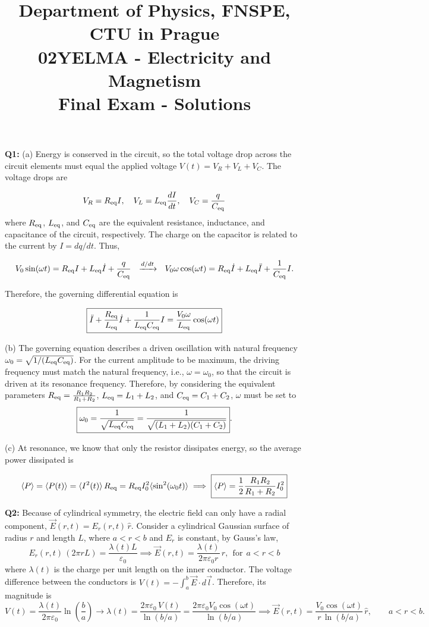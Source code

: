 \documentclass[a4paper,12pt]{article}
\title{{\large Department of Physics, FNSPE, CTU in Prague} \\
                  02YELMA - Electricity and Magnetism \\ 
          {\Large \textbf{Final Exam - Solutions}}\vspace{-1cm}}
\date{}
\author{}
\begin{document}
\maketitle
\vspace{-0.9cm}

\noindent

\textbf{Q1:} (a) Energy is conserved in the circuit, so the total voltage drop across the circuit elements must equal the applied voltage $V(t)=V_R+V_L+V_C$. The voltage drops are

\[
V_R = R_{\rm eq} I, \quad V_L = L_{\rm eq}\frac{dI}{dt}, \quad V_C = \frac{q}{C_{\rm eq}}
\]
where $R_{\rm eq}$, $L_{\rm eq}$, and $C_{\rm eq}$ are the equivalent resistance, inductance, and capacitance of the circuit, respectively. The charge on the capacitor is related to the current by $I=dq/dt$. Thus,

\[
V_0\sin(\omega t)
=
R_{\rm eq} I
+
L_{\rm eq}\dot{I}
+
\frac{q}{C_{\rm eq}} ~~\xrightarrow{d/dt}~~ V_0\omega\cos(\omega t)
=
R_{\rm eq}\dot{I}
+
L_{\rm eq}\ddot{I}
+
\frac{1}{C_{\rm eq}}I.
\]

Therefore, the governing differential equation is

\[
\boxed{
\ddot{I}
+
\frac{{R}_{\rm eq}}{L_{\rm eq}}\dot{I}
+
\frac{1}{L_{\rm eq}C_{\rm eq}}I
=
\frac{V_0\omega}{L_{\rm eq}}\cos(\omega t)
}
\]

(b) The governing equation describes a driven oscillation with natural frequency $\omega_0=\sqrt{1/(L_{\rm eq}C_{\rm eq})}$. For the current amplitude to be maximum, the driving frequency must match the natural frequency, i.e., $\omega=\omega_0$, so that the circuit is driven at its resonance frequency. Therefore, by considering the equivalent parameters $R_{\rm eq}=\frac{R_1R_2}{R_1+R_2}$, $L_{\rm eq}=L_1+L_2$, and $C_{\rm eq}=C_1+C_2$, $\omega$ must be set to
\[
\boxed{
\omega_0
=
\frac{1}{\sqrt{L_{\rm eq}C_{\rm eq}}}
=
\frac{1}{\sqrt{(L_1+L_2)(C_1+C_2)}}
}.
\]

(c) At resonance, we know that only the resistor dissipates energy, so the average power dissipated is

\[ \langle P \rangle =
\langle P(t) \rangle=\langle I^2(t) \rangle\,R_{\rm eq}=R_{\rm eq} I_0^2 \langle \sin^2(\omega_0 t) \rangle \implies \boxed{\langle P \rangle=\frac{1}{2}\frac{R_1R_2}{R_1+R_2} I_0^2}
\]

\textbf{Q2:} 
Because of cylindrical symmetry, the electric field can only have a radial component, $\vec E(r,t)=E_r(r,t)\,\hat r$. Consider a cylindrical Gaussian surface of radius \(r\) and length \(L\), where \(a<r<b\) and $E_r$ is constant, by Gauss's law,
\[
E_r(r,t)\,(2\pi rL)
=
\frac{\lambda(t)L}{\varepsilon_0} \implies \vec E(r,t)
=
\frac{\lambda(t)}{2\pi\varepsilon_0 r}\,\hat r,
~~\text{for}~~a<r<b
\]
where \(\lambda(t)\) is the charge per unit length on the inner conductor. The voltage difference between the conductors is $V(t)= -\int_a^b \vec E\cdot d\vec l$. Therefore, its magnitude is
\[
V(t)
=
\frac{\lambda(t)}{2\pi\varepsilon_0}
\ln\!\left(\frac{b}{a}\right) \rightarrow \lambda(t)
=
\frac{2\pi\varepsilon_0\,V(t)} 
{\ln(b/a)} =
\frac{2\pi\varepsilon_0 V_0\cos(\omega t)}
{\ln(b/a)} \implies \boxed{
\vec E(r,t)
=
\frac{V_0\cos(\omega t)}
{r\,\ln(b/a)}
\,\hat r,
\qquad a<r<b.
}
\]
\end{document}
